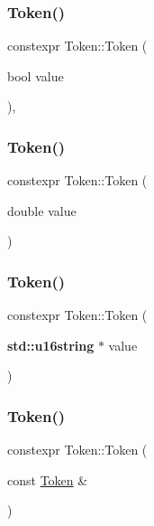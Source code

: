\subsubsection{\texorpdfstring{Token()}{Token()}\hspace{0.1cm}{\footnotesize\ttfamily [6/16]}}
{\footnotesize\ttfamily constexpr Token\+::\+Token (\begin{DoxyParamCaption}\item[{bool}]{value }\end{DoxyParamCaption})\hspace{0.3cm}{\ttfamily [inline]}, {\ttfamily [explicit]}}

\mbox{\label{class_token_a8a60cd16e3e648204849506898a988c5}} 
\subsubsection{\texorpdfstring{Token()}{Token()}\hspace{0.1cm}{\footnotesize\ttfamily [7/16]}}
{\footnotesize\ttfamily constexpr Token\+::\+Token (\begin{DoxyParamCaption}\item[{double}]{value }\end{DoxyParamCaption})\hspace{0.3cm}{\ttfamily [inline]}}

\mbox{\label{class_token_ad12059c7d3ba95df57a4684c05b6ca97}} 
\subsubsection{\texorpdfstring{Token()}{Token()}\hspace{0.1cm}{\footnotesize\ttfamily [8/16]}}
{\footnotesize\ttfamily constexpr Token\+::\+Token (\begin{DoxyParamCaption}\item[{\textbf{ std\+::u16string} $\ast$}]{value }\end{DoxyParamCaption})\hspace{0.3cm}{\ttfamily [inline]}}

\mbox{\label{class_token_a6cf4d1944e2b5714735ed54e3f9651d0}} 
\subsubsection{\texorpdfstring{Token()}{Token()}\hspace{0.1cm}{\footnotesize\ttfamily [9/16]}}
{\footnotesize\ttfamily constexpr Token\+::\+Token (\begin{DoxyParamCaption}\item[{const \hyperlink{class_token}{Token} \&}]{ }\end{DoxyParamCaption})\hspace{0.3cm}{\ttfamily [default]}}

